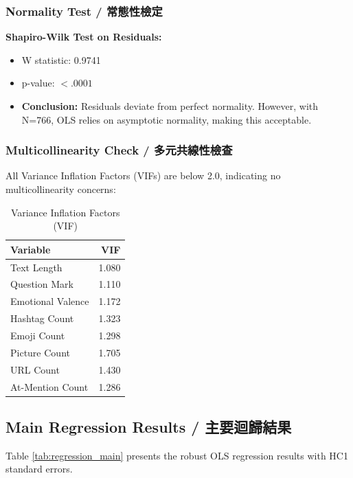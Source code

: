 \documentclass[12pt,a4paper,fontset=none]{ctexart}
\begin{document}
\subsubsection{Normality Test / 常態性檢定}

\textbf{Shapiro-Wilk Test on Residuals:}
\begin{itemize}
    \item W statistic: 0.9741
    \item p-value: $< .0001$
    \item \textbf{Conclusion:} Residuals deviate from perfect normality. However, with N=766, OLS relies on asymptotic normality, making this acceptable.
\end{itemize}

\subsubsection{Multicollinearity Check / 多元共線性檢查}

All Variance Inflation Factors (VIFs) are below 2.0, indicating no multicollinearity concerns:

\begin{table}[H]
\centering
\caption{Variance Inflation Factors (VIF)}
\small
\begin{tabular}{lr}
\toprule
Variable & VIF \\
\midrule
Text Length & 1.080 \\
Question Mark & 1.110 \\
Emotional Valence & 1.172 \\
Hashtag Count & 1.323 \\
Emoji Count & 1.298 \\
Picture Count & 1.705 \\
URL Count & 1.430 \\
At-Mention Count & 1.286 \\
\bottomrule
\end{tabular}
\end{table}

\subsection{Main Regression Results / 主要迴歸結果}

Table \ref{tab:regression_main} presents the robust OLS regression results with HC1 standard errors.
\end{document}
